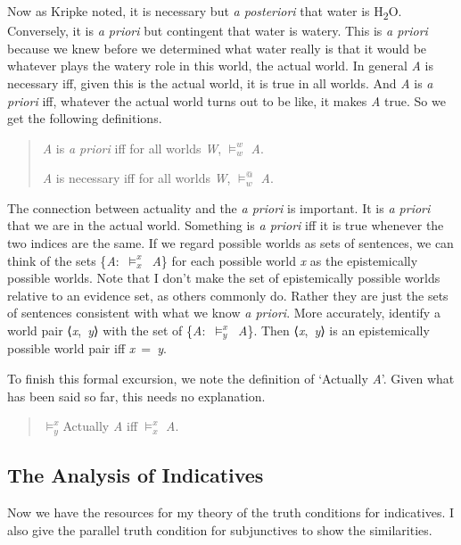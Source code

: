 \documentclass[
  11pt,
  letterpaper,
  DIV=11,
  numbers=noendperiod,
  twoside]{scrartcl}
\begin{document}
Now as Kripke noted, it is necessary but \emph{a posteriori} that water
is H\textsubscript{2}O. Conversely, it is \emph{a priori} but contingent
that water is watery. This is \emph{a priori} because we knew before we
determined what water really is that it would be whatever plays the
watery role in this world, the actual world. In general \emph{A} is
necessary iff, given this is the actual world, it is true in all worlds.
And \emph{A} is \emph{a priori} iff, whatever the actual world turns out
to be like, it makes \emph{A} true. So we get the following definitions.

\begin{quote}
\emph{A} is \emph{a priori} iff for all worlds \emph{W}, \(\vDash_w^w\)
\emph{A}.

\emph{A} is necessary iff for all worlds \emph{W}, \(\vDash_w^@\)
\emph{A}.
\end{quote}

The connection between actuality and the \emph{a priori} is important.
It is \emph{a priori} that we are in the actual world. Something is
\emph{a priori} iff it is true whenever the two indices are the same. If
we regard possible worlds as sets of sentences, we can think of the sets
\{\emph{A}:~\(\vDash_x^x\)~\emph{A}\} for each possible world \emph{x}
as the epistemically possible worlds. Note that I don't make the set of
epistemically possible worlds relative to an evidence set, as others
commonly do. Rather they are just the sets of sentences consistent with
what we know \emph{a priori}. More accurately, identify a world pair
⟨\emph{x},~\emph{y}⟩ with the set of
\{\emph{A}:~\(\vDash_y^x\)~\emph{A}\}. Then ⟨\emph{x},~\emph{y}⟩ is an
epistemically possible world pair iff \emph{x}~=~\emph{y}.

To finish this formal excursion, we note the definition of `Actually
\emph{A}'. Given what has been said so far, this needs no explanation.

\begin{quote}
\(\vDash_y^x\)Actually \emph{A} iff \(\vDash_x^x\) \emph{A}.
\end{quote}

\subsection{The Analysis of
Indicatives}\label{the-analysis-of-indicatives}

Now we have the resources for my theory of the truth conditions for
indicatives. I also give the parallel truth condition for subjunctives
to show the similarities.
\end{document}
